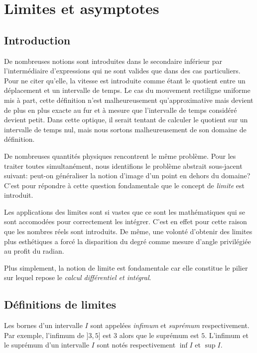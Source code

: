 \documentclass[main.tex]{subfiles}
\begin{document}
\chapter{Limites et asymptotes}

\section{Introduction}

De nombreuses notions sont introduites dans le secondaire inférieur par l'intermédiaire d'expressions
qui ne sont valides que dans des cas particuliers.
Pour ne citer qu'elle,
la vitesse est introduite comme étant le quotient entre un déplacement et un intervalle de temps.
Le cas du mouvement rectiligne uniforme mis à part,
cette définition n'est malheureusement qu'approximative
mais devient de plus en plus exacte
au fur et à mesure que l'intervalle de temps considéré devient petit.
Dans cette optique,
il serait tentant de calculer le quotient sur un intervalle de temps nul,
mais nous sortons malheureusement de son domaine de définition.

De nombreuses quantités physiques rencontrent le même problème.
Pour les traiter toutes simultanément,
nous identifions le problème abstrait sous-jacent suivant:
peut-on généraliser la notion d'image d'un point en dehors du domaine?
C'est pour répondre à cette question fondamentale que le concept de \emph{limite} est introduit.

Les applications des limites sont si vastes
que ce sont les mathématiques qui se sont accomodées pour correctement les intégrer.
C'est en effet pour cette raison que les nombres réels sont introduits.
De même,
une volonté d'obtenir des limites plus esthétiques a forcé la disparition du degré comme mesure d'angle privilégiée au profit du radian.

Plus simplement,
la notion de limite est fondamentale
car elle constitue le pilier sur lequel repose le \emph{calcul différentiel et intégral}.

\section{Définitions de limites}

Les bornes d'un intervalle $I$ sont appelées \emph{infimum} et \emph{suprémum} respectivement.
Par exemple, l'infimum de $]3, 5]$ est $3$ alors que le suprémum est $5$.
L'infimum et le suprémum d'un intervalle $I$ sont notés respectivement $\inf I$ et $\sup I$.
\end{document}
